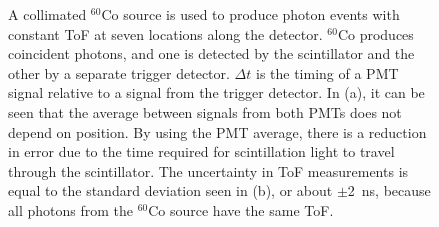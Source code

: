 \begin{figure}[h]
\centering
{}

\caption{A collimated $^{60}$Co source is used to produce photon events with constant ToF at seven locations along the detector.
$^{60}$Co produces coincident photons, and one is detected by the scintillator and the other by a separate trigger detector.
 $\Delta t$ is the timing of a PMT signal relative to a signal from the trigger detector. 
 In (a), it can be seen that the average between signals from both PMTs does not depend on position.
By using the PMT average, there is a reduction in error due to the time required for scintillation light to travel through the scintillator.
The uncertainty in ToF measurements is equal to the standard deviation seen in (b), or about $\pm$2~ns, because all photons from the $^{60}$Co source have the same ToF.}
\label{fig:ConstPMTAvg}
\end{figure}

